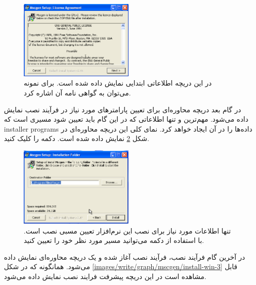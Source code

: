 \begin{figure}
	\centering
	\includegraphics[width=0.5\textwidth]{images/write/graph/mscgen/install-win-1}
	\caption[اطلاعات کلی نرم‌افزار برای نصب در سیستم‌عامل ویندوز]{
		در این دریچه اطلاعاتی ابتدایی نمایش داده شده است. برای نمونه می‌توان به گواهی
		نامه آن اشاره کرد.
	}
	\label{images/write/graph/mscgen/install-win-1}
\end{figure}

در گام بعد دریچه محاوره‌ای برای تعیین پارامترهای مورد نیاز در فرآیند نصب نمایش
داده می‌شود. مهم‌ترین و تنها اطلاعاتی که در این گام باید تعیین شود مسیری است که
\glspl{installer program} داده‌ها را در آن ایجاد خواهد کرد. نمای کلی این دریچه
محاوره‌ای در شکل \ref{images/write/graph/mscgen/install-win-2}
نمایش داده شده است. دکمه  را کلیک کنید.

\begin{figure}
	\centering
	\includegraphics[width=0.5\textwidth]{images/write/graph/mscgen/install-win-2}
	\caption[تنظیم مورد نیاز برای نصب  در ویندوز]{
		تنها اطلاعات مورد نیاز برای نصب این نرم‌افزار تعیین مسبی نصب است. با استفاده
		از دکمه  می‌توانید مسیر مورد نظر خود را تعیین کنید.
	}
	\label{images/write/graph/mscgen/install-win-2}
\end{figure}

در آخرین گام فرآیند نصب، فرآیند نصب آغاز شده و یک دریچه محاوره‌ای نمایش داده
می‌شود. همانگونه که در شکل \ref{images/write/graph/mscgen/install-win-3}
قابل مشاهده است در این دریچه پیشرفت فرایند نصب نمایش داده می‌شود.

